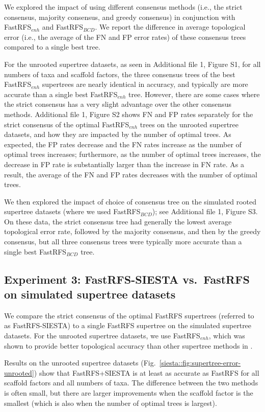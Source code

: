 We explored the impact of using different consensus methods (i.e., the strict consensus, majority consensus, and greedy consensus) in conjunction with FastRFS$_{enh}$ and FastRFS$_{BCD}$. 
We report the difference in average topological error (i.e., the average of the FN and FP error rates) of these consensus trees compared to a single best tree. 

For the unrooted supertree datasets, as seen in  Additional file 1, Figure S1,  for all numbers of taxa and scaffold factors,   the three
consensus trees of the best FastRFS$_{enh}$ supertrees are nearly identical in accuracy, and typically are more accurate than a single best FastRFS$_{enh}$ tree.
However, there are some cases where the strict consensus has a very slight advantage over the other consensus methods.
Additional file 1, Figure S2 shows FN and FP rates separately for the strict consensus of the optimal FastRFS$_{enh}$ trees on the unrooted supertree datasets, and how they are impacted by the number of optimal trees. 
As expected, the FP rates decrease and the FN rates increase  as the number of optimal trees increases; furthermore, 
as the number of optimal trees increases, the  decrease in FP rate is substantially larger than the increase in FN rate.
As a result, the average of the FN and FP rates decreases with the number of optimal trees. 

We then explored the impact of choice of consensus tree on the simulated rooted supertree datasets (where we used FastRFS$_{BCD}$); see Additional file 1, Figure S3.
On these data, the strict consensus tree had generally the lowest average topological error rate, followed by the majority consensus, and then by the greedy consensus, but all three consensus trees were typically more accurate than a single best FastRFS$_{BCD}$ tree. 


\subsection{Experiment 3: FastRFS-SIESTA vs.~FastRFS on simulated supertree datasets }
We compare the strict consensus of the optimal FastRFS  supertrees (referred to as FastRFS-SIESTA) to a single FastRFS supertree on the simulated supertree datasets.
For the unrooted supertree datasets, we use FastRFS$_{enh}$, which was shown to provide better topological accuracy than other supertree methods in \cite{vachaspati2017fastrfs}.

Results on the unrooted supertree datasets  (Fig.~\ref{siesta::fig:supertree-error-unrooted}) show that 
FastRFS+SIESTA is at least as accurate as FastRFS for all scaffold factors and all numbers of taxa.
The difference between the  two methods is often small, but there are larger improvements when the scaffold factor is the smallest (which is also when the number of optimal trees is largest).


